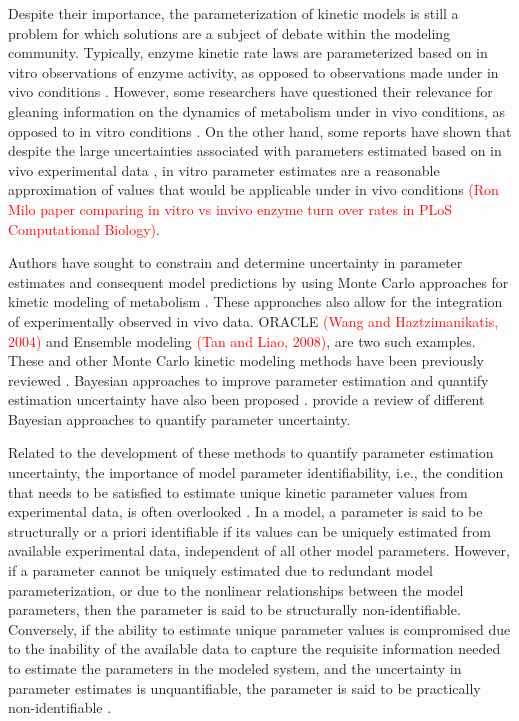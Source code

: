 \documentclass[10pt]{article}
\begin{document}
	Despite their importance, the parameterization of kinetic models is still a problem for which solutions are a subject of debate within the modeling community. Typically, enzyme kinetic rate laws are parameterized based on in vitro observations of enzyme activity, as opposed to observations made under in vivo conditions \parencite{Heijnen2005,Smallbone2007}. However, some researchers have questioned their relevance for gleaning information on the dynamics of metabolism under in vivo conditions, as opposed to in vitro conditions \parencite{Heijnen2005,Heijnen2013}. On the other hand, some reports have shown that despite the large uncertainties associated with parameters estimated based on in vivo experimental data \parencite{Link2014}, in vitro parameter estimates are a reasonable approximation of values that would be applicable under in vivo conditions \textcolor{red}{(Ron Milo paper comparing in vitro vs invivo enzyme turn over rates in PLoS Computational Biology)}.
	
	 Authors have sought to constrain and determine uncertainty in parameter estimates and consequent model predictions by using Monte Carlo approaches for kinetic modeling of metabolism \parencite{Andreozzi2016a}. These approaches also allow for the integration of experimentally observed in vivo data. ORACLE \textcolor{red}{(Wang and Haztzimanikatis, 2004)} and Ensemble modeling \textcolor{red}{(Tan and Liao, 2008)}, are two such examples. These and other Monte Carlo kinetic modeling methods have been previously reviewed \parencite{Srinivasan2015}. 	 
	 Bayesian approaches to improve parameter estimation and quantify estimation uncertainty have also been proposed \parencite{Saa2016}. \cite{Vanlier2013} provide a review of different Bayesian approaches to quantify parameter uncertainty.	 
	
	Related to the development of these methods to quantify parameter estimation uncertainty, the importance of model parameter identifiability, i.e., the condition that needs to be satisfied to estimate unique kinetic parameter values from experimental data, is often overlooked \parencite{Ljung1994,Berthoumieux2013}. In a model, a parameter is said to be structurally or a priori identifiable if its values can be uniquely estimated from available experimental data, independent of all other model parameters. However, if a parameter cannot be uniquely estimated due to redundant model parameterization, or due to the nonlinear relationships between the model parameters, then the parameter is said to be structurally non-identifiable. Conversely, if the ability to estimate unique parameter values is compromised due to the inability of the available data to capture the requisite information needed to estimate the parameters in the modeled system, and the uncertainty in parameter estimates is unquantifiable, the parameter is said to be practically non-identifiable \parencite{Ljung1994}. 
	
\end{document}
